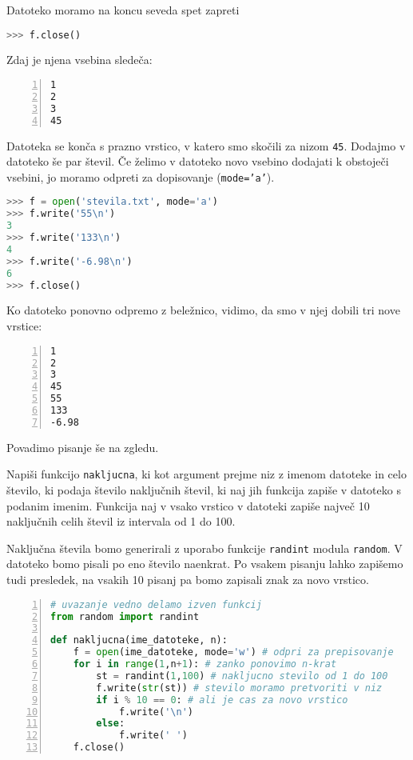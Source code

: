 Datoteko moramo na koncu seveda spet zapreti
\begin{lstlisting}[language=Python, showstringspaces=false]
>>> f.close()
\end{lstlisting}
Zdaj je njena vsebina sledeča:
\begin{lstlisting}[showstringspaces=false,numbers=left,showlines=true]
1
2
3
45

\end{lstlisting}
Datoteka se konča s prazno vrstico, v katero smo skočili za nizom \texttt{45}. Dodajmo v datoteko še par števil. Če želimo v datoteko novo vsebino dodajati k obstoječi vsebini, jo moramo odpreti za dopisovanje (\texttt{mode='a'}).
\begin{lstlisting}[language=Python, showstringspaces=false]
>>> f = open('stevila.txt', mode='a')
>>> f.write('55\n')
3
>>> f.write('133\n')
4
>>> f.write('-6.98\n')
6
>>> f.close()
\end{lstlisting}
Ko datoteko ponovno odpremo z beležnico, vidimo, da smo v njej dobili tri nove vrstice:
\begin{lstlisting}[showstringspaces=false,numbers=left,showlines=true]
1
2
3
45
55
133
-6.98

\end{lstlisting}

Povadimo pisanje še na zgledu.
\begin{zgled}
Napiši funkcijo \texttt{nakljucna}, ki kot argument prejme niz z imenom datoteke in celo število, ki podaja število naključnih števil, ki naj jih funkcija zapiše v datoteko s podanim imenim. Funkcija naj v vsako vrstico v datoteki zapiše največ 10 naključnih celih števil iz intervala od 1 do 100.
\end{zgled}
\begin{resitev}
Naključna števila bomo generirali z uporabo funkcije \texttt{randint} modula \texttt{random}. V datoteko bomo pisali po eno število naenkrat. Po vsakem pisanju lahko zapišemo tudi presledek, na vsakih 10 pisanj pa bomo zapisali znak za novo vrstico.
\begin{lstlisting}[language=Python, showstringspaces=false,numbers=left]
# uvazanje vedno delamo izven funkcij
from random import randint

def nakljucna(ime_datoteke, n):
    f = open(ime_datoteke, mode='w') # odpri za prepisovanje
    for i in range(1,n+1): # zanko ponovimo n-krat
        st = randint(1,100) # nakljucno stevilo od 1 do 100
        f.write(str(st)) # stevilo moramo pretvoriti v niz
        if i % 10 == 0: # ali je cas za novo vrstico
            f.write('\n')
        else:
            f.write(' ')
    f.close()
\end{lstlisting}
\end{resitev}

